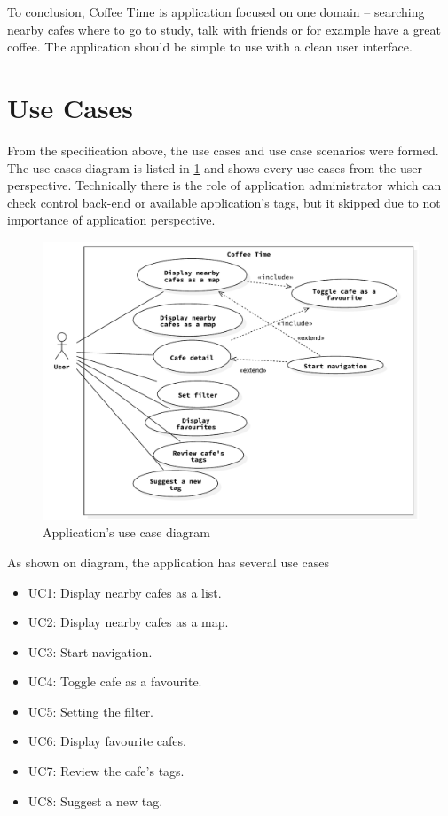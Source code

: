 To conclusion, Coffee Time is application focused on one domain -- searching nearby cafes where to go to study, talk with friends or for example have a great coffee. The application should be simple to use with a clean user interface. 
\section{Use Cases}
From the specification above, the use cases and use case scenarios were formed. The use cases diagram is listed in \cref{fig:use_case} and shows every use cases from the user perspective. Technically there is the role of application administrator which can check control back-end or available application's tags, but it skipped due to not importance of application perspective. 

\begin{figure}[htp]
    \centering
    \includegraphics[width=\linewidth]{img/analysis/use_case.pdf}
    \caption{Application's use case diagram}
    \label{fig:use_case}
\end{figure}

As shown on diagram, the application has several use cases

\begin{itemize}
    \item UC1: Display nearby cafes as a list.
    \item UC2: Display nearby cafes as a map.
    \item UC3: Start navigation.
    \item UC4: Toggle cafe as a favourite.
    \item UC5: Setting the filter.
    \item UC6: Display favourite cafes.
    \item UC7: Review the cafe's tags.
    \item UC8: Suggest a new tag.
\end{itemize}

